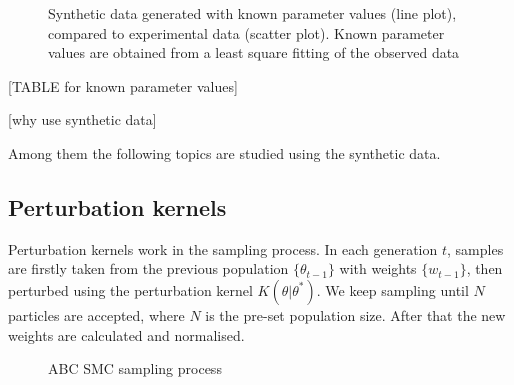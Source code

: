 \documentclass[12pt,a4paper]{report}
\begin{document}
\begin{figure}[h!]
    \begin{center}
    \end{center}
    
    \caption[Synthetic data generated with known parameter values]%
    {Synthetic data generated with known parameter values (line plot), compared to experimental data (scatter plot). Known parameter values are obtained from a least square fitting of the observed data} 
    \label{fig:infer_back_data}
    
\end{figure}

[TABLE for known parameter values]

[why use synthetic data]

Among them the following topics are studied using the synthetic data.

\subsection{Perturbation kernels}

Perturbation kernels work in the sampling process. In each generation $t$, samples are firstly taken from the previous population $\{\theta_{t-1}\}$ with weights $\{w_{t-1}\}$, then perturbed using the perturbation kernel $K(\theta|\theta^*)$. We keep sampling until $N$ particles are accepted, where $N$ is the pre-set population size. After that the new weights are calculated and normalised. 

\begin{figure}
    \begin{center}
    \end{center}
    
    \caption{ABC SMC sampling process} 
    \label{fig:smc}
    
\end{figure}
\end{document}
